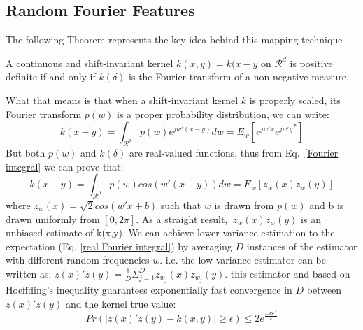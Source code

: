 \subsection{Random Fourier Features}
The following Theorem represents the key idea behind this mapping technique
\begin{theorem}
A continuous and shift-invariant kernel $k(x,y)=k(x-y$ on $\mathcal{R}^d$ is positive definite if and only if $k(\delta)$ is the Fourier transform of a non-negative measure.
\end{theorem}
What that means is that when a shift-invariant kernel $k$ is properly scaled, its Fourier transform $p(w)$ is a proper probability distribution, we can write:
\begin{equation}
\label{Fourier integral}
k(x-y)=\int_{\mathcal{R}^d}p(w)e^{j{w}'(x-y)}dw=E_w[e^{j{w}'x}{e^{j{w}'y}}^*]
\end{equation}
But both $p(w)$ and $k(\delta)$ are real-valued functions, thus from Eq.~\ref{Fourier integral} we can prove that:
\begin{equation}

k(x-y)=\int_{\mathcal{R}^d}p(w)cos({{w}'(x-y)})dw=E_w[z_w(x)z_w(y)]
\end{equation}
where $z_w(x)=\sqrt{2}cos({w}'x+b)$ such that $w$ is drawn from $p(w)$ and b is drawn uniformly from $[0,2\pi]$.\newline
As a straight result, $\ z_w(x)z_w(y)$ is an unbiased estimate of k(x,y). We can achieve lower variance estimation to the expectation (Eq. \ref{real Fourier integral}) by averaging $D$ instances of the estimator with different random frequencies $w$. i.e. the low-variance estimator can be written as: $z(x)'z(y)=\frac{1}{D} \Sigma_{j=1}^D z_{w_j}(x)z_{w_j}(y)$. this estimator and based on Hoeffding's inequality guarantees exponentially fast convergence in $D$ between $z(x)'z(y)$ and the kernel true value:
\begin{equation}
    Pr(|z(x)'z(y)-k(x,y)|\geq\epsilon)\leq2e^\frac{-D\epsilon^2}{4}
\end{equation}

